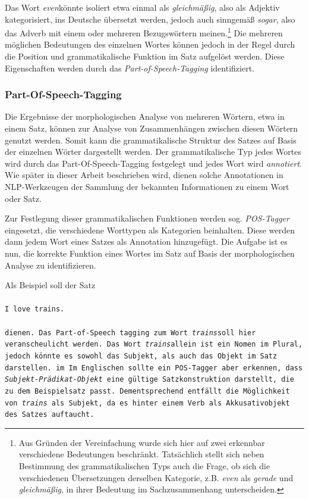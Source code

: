 \documentclass[12pt]{report}
\begin{document}
Das Wort \glqq \textit{even}\grqq könnte isoliert etwa einmal als \textit{gleichmäßig}, also als Adjektiv kategorisiert, ins Deutsche übersetzt werden, jedoch auch sinngemäß \textit{sogar}, also das Adverb mit einem oder mehreren Bezugswörtern meinen.\footnote{Aus Gründen der Vereinfachung wurde sich hier auf zwei erkennbar verschiedene Bedeutungen beschränkt. Tatsächlich stellt sich neben Bestimmung des grammatikalischen Typs auch die Frage, ob sich die verschiedenen Übersetzungen derselben Kategorie, z.B. \textit{even} als \textit{gerade} und \textit{gleichmäßig}, in ihrer Bedeutung im Sachzusammenhang unterscheiden.} Die mehreren möglichen Bedeutungen des einzelnen Wortes können jedoch in der Regel durch die Position und grammatikalische Funktion im Satz aufgelöst werden. Diese Eigenschaften werden durch das \textit{Part-of-Speech-Tagging} identifiziert.

\subsubsection{Part-Of-Speech-Tagging}
Die Ergebnisse der morphologischen Analyse von mehreren Wörtern, etwa in einem Satz, können zur Analyse von Zusammenhängen zwischen diesen Wörtern genutzt werden. Somit kann die grammatikalische Struktur des Satzes auf Basis der einzelnen Wörter dargestellt werden. Der grammatikalische Typ jedes Wortes wird durch das Part-Of-Speech-Tagging festgelegt und jedes Wort wird \textit{annotiert}. Wie später in dieser Arbeit beschrieben wird, dienen solche Annotationen in NLP-Werkzeugen der Sammlung der bekannten Informationen zu einem Wort oder Satz. 

Zur Festlegung dieser grammatikalischen Funktionen werden sog. \textit{POS-Tagger} eingesetzt, die verschiedene Worttypen als Kategorien beinhalten. Diese werden dann jedem Wort eines Satzes als Annotation hinzugefügt. Die Aufgabe ist es nun, die korrekte Funktion eines Wortes im Satz auf Basis der morphologischen Analyse zu identifizieren. 

Als Beispiel soll der Satz 
\\
\tt
\\I love trains.\\
\\ \rm 
dienen. Das Part-of-Speech tagging zum Wort \glqq \textit{trains}\grqq soll hier veranscheulicht werden. Das Wort \glqq \textit{trains}\grqq allein ist ein Nomen im Plural, jedoch könnte es sowohl das Subjekt, als auch das Objekt im Satz darstellen. im Im Englischen sollte ein POS-Tagger aber erkennen, dass \textit{Subjekt-Prädikat-Objekt} eine gültige Satzkonstruktion darstellt, die zu dem Beispielsatz passt. Dementsprechend entfällt die Möglichkeit von \textit{trains} als Subjekt, da es hinter einem Verb als Akkusativobjekt des Satzes auftaucht.
\end{document}
